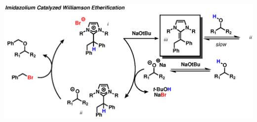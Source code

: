  \begin{center}
\includegraphics[scale=0.8]{chp_alkylation_abstract}
 \end{center}

 
 \singlespacing